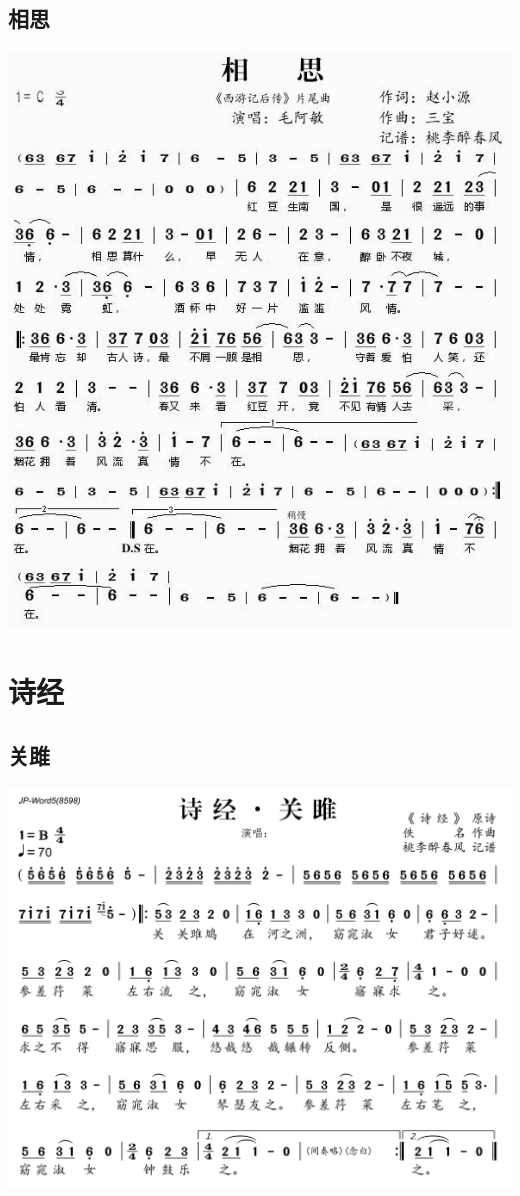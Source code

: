 \documentclass[cn,pad,twocol]{elegantbook}
\begin{document}
\section{相思}\includegraphics[width=\textwidth]{dongxiao/20200819/西游记-相思.png}

\chapter{诗经}
\section{关雎}      \includegraphics[width=\textwidth]{rpi400/20210124关雎.png}
\end{document}
